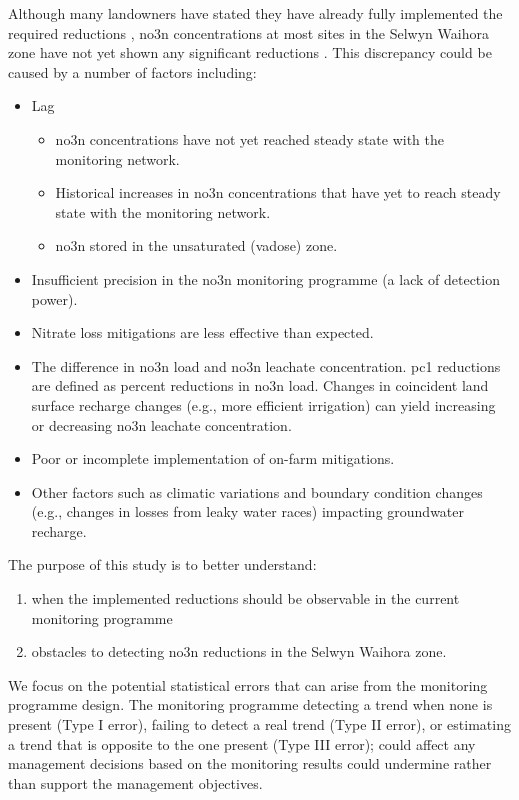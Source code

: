 Although many landowners have stated they have already fully implemented the required reductions \citep{scottpc}, \gls{no3n} concentrations at most sites in the Selwyn Waihora zone have not yet shown any significant reductions \citep{ecan_annual_survey}.
This discrepancy could be caused by a number of factors including:
\begin{itemize}
    \item Lag
    \begin{itemize}
        \item \gls{no3n} concentrations have not yet reached steady state with the monitoring network.
        \item Historical increases in \gls{no3n} concentrations that have yet to reach steady state with the monitoring network.
        \item \gls{no3n} stored in the unsaturated (vadose) zone.
    \end{itemize}
    \item Insufficient precision in the \gls{no3n} monitoring programme (a lack of detection power).
    \item Nitrate loss mitigations are less effective than expected.
    \item The difference in \gls{no3n} load and \gls{no3n} leachate concentration. \gls{pc1} reductions are defined as percent reductions in \gls{no3n} load. Changes in coincident land surface recharge changes (e.g., more efficient irrigation) can yield increasing or decreasing \gls{no3n} leachate concentration.
    \item Poor or incomplete implementation of on-farm mitigations.
    \item Other factors such as climatic variations and boundary condition changes (e.g., changes in losses from leaky water races) impacting groundwater recharge.
\end{itemize}

The purpose of this study is to better understand:
\begin{enumerate}
    \item when the implemented reductions should be observable in the current monitoring programme
    \item obstacles to detecting \gls{no3n} reductions in the Selwyn Waihora zone.
\end{enumerate}

We focus on the potential statistical errors that can arise from the monitoring programme design.
The monitoring programme detecting a trend when none is present (Type I error), failing to detect a real trend (Type II error), or estimating a trend that is opposite to the one present (Type III error); could affect any management decisions based on the monitoring results could undermine rather than support the management objectives.
